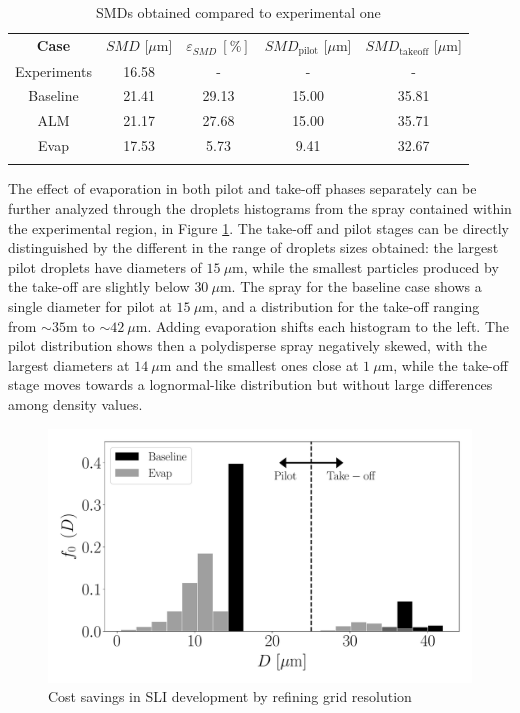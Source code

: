 \begin{table}[!h]
\centering
\caption{SMDs obtained compared to experimental one}
\begin{tabular}{ccccc}
\thickhline
\textbf{Case} & $SMD$ [$\mu$m] & $\varepsilon_{SMD}~\left[\% \right]$ & $SMD_\mathrm{pilot}$ [$\mu$m] & $SMD_\mathrm{takeoff}$ [$\mu$m]   \\
\thickhline
Experiments & 16.58 & - & - & - \\
Baseline & 21.41 & 29.13 &15.00 & 35.81 \\
ALM & 21.17 & 27.68 & 15.00 & 35.71 \\
Evap & 17.53 & 5.73 & 9.41 & 32.67 \\ 
\thickhline
\end{tabular}
\label{tab:BIMER_dispersed_phase_characteristic_times}
\end{table}


The effect of evaporation in both pilot and take-off phases separately can be further analyzed through the droplets histograms from the spray contained within the experimental region, in Figure \ref{fig:LGS_BIMER_droplets_histograms}. The take-off and pilot stages can be directly distinguished by the different in the range of droplets sizes obtained: the largest pilot droplets have diameters of $15~\mu$m, while the smallest particles produced by the take-off are slightly below $30~\mu$m. The spray for the baseline case shows a single diameter for pilot at $15~\mu$m, and a distribution for the take-off ranging from $\sim 35$m to $\sim 42~\mu$m. Adding evaporation shifts each histogram to the left. The pilot distribution shows then a polydisperse spray negatively skewed, with the largest diameters at $14~\mu$m and the smallest ones close at $1~\mu$m, while the take-off stage moves towards a lognormal-like distribution but without large differences among density values.




\begin{figure}[ht]
   \centering
   \includegraphics[scale=0.4]{./part3_applications/figures_ch9_lagrangian/droplets_histograms}
   \caption{Cost savings in SLI development by refining grid resolution}
   \label{fig:LGS_BIMER_droplets_histograms}
\end{figure}

